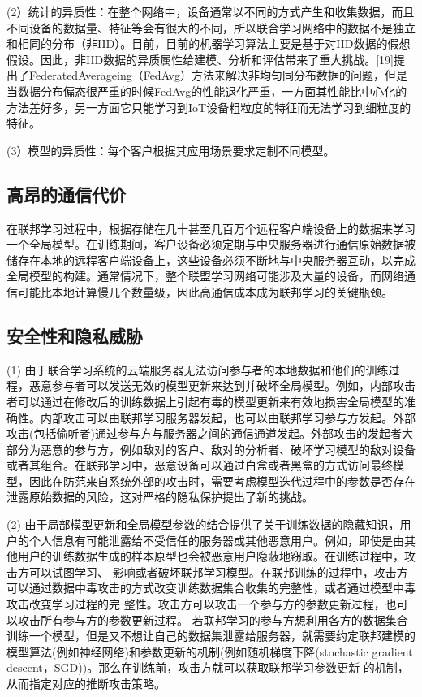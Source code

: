 (2）统计的异质性：在整个网络中，设备通常以不同的方式产生和收集数据，而且不同设备的数据量、特征等会有很大的不同，所以联合学习网络中的数据不是独立和相同的分布（非IID）。目前，目前的机器学习算法主要是基于对IID数据的假想假设。因此，非IID数据的异质属性给建模、分析和评估带来了重大挑战。[19]提出了FederatedAverageing（FedAvg）方法来解决非均匀同分布数据的问题，但是当数据分布偏态很严重的时候FedAvg的性能退化严重，一方面其性能比中心化的方法差好多，另一方面它只能学习到IoT设备粗粒度的特征而无法学习到细粒度的特征。

(3）模型的异质性：每个客户根据其应用场景要求定制不同模型。

\subsection{高昂的通信代价}
在联邦学习过程中，根据存储在几十甚至几百万个远程客户端设备上的数据来学习一个全局模型。在训练期间，客户设备必须定期与中央服务器进行通信原始数据被储存在本地的远程客户端设备上，这些设备必须不断地与中央服务器互动，以完成全局模型的构建。通常情况下，整个联盟学习网络可能涉及大量的设备，而网络通信可能比本地计算慢几个数量级，因此高通信成本成为联邦学习的关键瓶颈。

\subsection{安全性和隐私威胁}

(1) 由于联合学习系统的云端服务器无法访问参与者的本地数据和他们的训练过程，恶意参与者可以发送无效的模型更新来达到并破坏全局模型。例如，内部攻击者可以通过在修改后的训练数据上引起有毒的模型更新来有效地损害全局模型的准确性。内部攻击可以由联邦学习服务器发起，也可以由联邦学习参与方发起。外部攻击(包括偷听者)通过参与方与服务器之间的通信通道发起。外部攻击的发起者大部分为恶意的参与方，例如敌对的客户、敌对的分析者、破坏学习模型的敌对设备或者其组合。在联邦学习中，恶意设备可以通过白盒或者黑盒的方式访问最终模型，因此在防范来自系统外部的攻击时，需要考虑模型迭代过程中的参数是否存在泄露原始数据的风险，这对严格的隐私保护提出了新的挑战。

(2) 由于局部模型更新和全局模型参数的结合提供了关于训练数据的隐藏知识，用户的个人信息有可能泄露给不受信任的服务器或其他恶意用户。例如，即使是由其他用户的训练数据生成的样本原型也会被恶意用户隐蔽地窃取。在训练过程中，攻击方可以试图学习、 影响或者破坏联邦学习模型。在联邦训练的过程中，攻击方可以通过数据中毒攻击的方式改变训练数据集合收集的完整性，或者通过模型中毒攻击改变学习过程的完 整性。攻击方可以攻击一个参与方的参数更新过程，也可以攻击所有参与方的参数更新过程。
若联邦学习的参与方想利用各方的数据集合训练一个模型，但是又不想让自己的数据集泄露给服务器，就需要约定联邦建模的模型算法(例如神经网络)和参数更新的机制(例如随机梯度下降(stochastic gradient descent，SGD))。那么在训练前，攻击方就可以获取联邦学习参数更新 的机制，从而指定对应的推断攻击策略。

